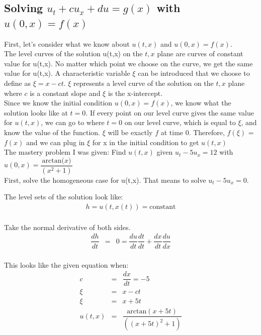 \documentclass{article}
\newcommand{\bea}{\begin{eqnarray*}}
\newcommand{\eea}{\end{eqnarray*}}
\newcommand{\blue}[1]{\textcolor{blue}{#1}}
\begin{document}
\subsection{Solving $u_t+cu_x +du = g(x)$ with $u(0,x)=f(x)$}

First, let's consider what we know about $u(t,x)$ and $u(0,x)=f(x)$. \\

The level curves of the solution u(t,x) on the $t,x$ plane are curves of constant value for u(t,x). No matter which point we choose on the curve, we get the same value for u(t,x). A characteristic variable $\xi$ can be introduced that we choose to define as $\xi = x-ct$. $\xi$ represents a level curve of the solution on the $t,x$ plane where $c$ is a constant slope and $\xi$ is the x-intercept.\\

Since we know the initial condition $u(0,x) = f(x)$, we know what the solution looks like at $t=0$. If every point on our level curve gives the same value for $u(t,x)$, we can go to where $t=0$ on our level curve, which is equal to $\xi$, and know the value of the function. $\xi$ will be exactly $f$ at time 0. Therefore, $f(\xi)$ = $f(x)$ and we can plug in $\xi$ for x in the initial condition to get $u(t,x)$ \\

The mastery problem I was given: Find $u(t,x)$ given $u_t-5u_x=12$ with $u(0,x) = \dfrac{\mbox{arctan($x$)}}{(x^2+1)}$ \\

First, solve the homogeneous case for u(t,x). That means to solve $u_t-5u_x=0$.\newline 

The level sets of the solution look like:
\bea
h = u(t,x(t)) = \mbox{constant} \\
\eea

Take the normal derivative of both sides.
\bea
\dfrac{dh}{dt} &=& 0  = \dfrac{du}{dt}\dfrac{dt}{dt} + \dfrac{dx}{dt}\dfrac{du}{dx}\\
\eea

This looks like the given equation when:
\bea
c &=& \dfrac{dx}{dt} = -5 \\
\xi &=& x-ct \\
\xi &=& x+5t  \\
u(t,x) &=& \dfrac{\mbox{arctan}(x+5t)}{((x+5t)^2+1)}  \\
\eea
\end{document}
